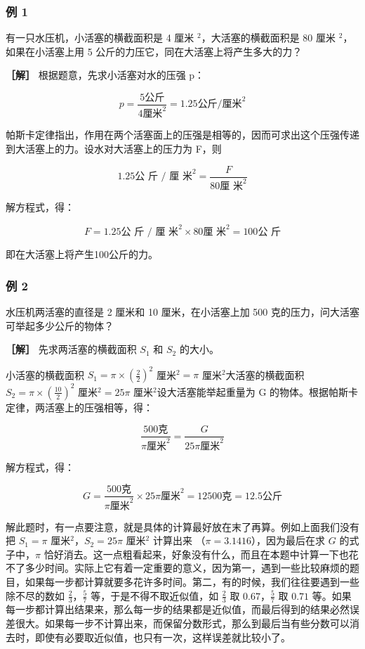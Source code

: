 \subsubsection{例 1}\label{ux4f8b-1-3}

有一只水压机，小活塞的横截面积是 4 厘米 \(^{2}\)，大活塞的横截面积是 80
厘米 \(^{2}\)，如果在小活塞上用 5
公斤的力压它，同在大活塞上将产生多大的力？

\textbf{［解］} 根据题意，先求小活塞对水的压强 p：

\[
p = \frac {5 \text{公斤}}{4 \text{厘米} ^ {2}} = 1.25 \text{公斤/厘米} ^ {2}
\]

帕斯卡定律指出，作用在两个活塞面上的压强是相等的，因而可求出这个压强传递到大活塞上的力。设水对大活塞上的压力为
F，则

\[
1.25 \text{公 斤 / 厘 米} ^ {2} = \frac {F}{80 \text{厘 米} ^ {2}}
\]

解方程式，得：

\[
F = 1.25 \text{公 斤 / 厘 米} ^ {2} \times 80 \text{厘 米} ^ {2} = 100 \text{公 斤}
\]

即在大活塞上将产生100公斤的力。

\subsubsection{例 2}\label{ux4f8b-2-3}

水压机两活塞的直径是 2 厘米和 10 厘米，在小活塞上加 500
克的压力，问大活塞可举起多少公斤的物体？

\textbf{［解］} 先求两活塞的横截面积 \(S_{1}\) 和 \(S_{2}\) 的大小。

小活塞的横截面积 \(S_{1} = \pi \times \left(\frac{2}{2}\right)^{2}\)
厘米\(^{2} = \pi\) 厘米\(^{2}\)大活塞的横截面积
\(S_{2} = \pi \times \left(\frac{10}{2}\right)^{2}\)
厘米\(^{2} = 25\pi\) 厘米\(^{2}\)设大活塞能举起重量为 G
的物体。根据帕斯卡定律，两活塞上的压强相等，得：

\[
\frac {500 \text{克}}{\pi \text{厘米} ^ {2}} = \frac {G}{25 \pi \text{厘米} ^ {2}}
\]

解方程式，得：

\[
G = \frac {500 \text{克}}{\pi \text{厘米} ^ {2}} \times 25 \pi \text{厘米} ^ {2} = 12500 \text{克} = 12.5 \text{公斤}
\]

解此题时，有一点要注意，就是具体的计算最好放在末了再算。例如上面我们没有把
\(S_{1} = \pi\) 厘米\(^{2}\)，\(S_{2} = 25\pi\) 厘米\(^{2}\) 计算出来
（\(\pi = 3.1416\)），因为最后在求 \(G\) 的式子中，\(\pi\)
恰好消去。这一点粗看起来，好象没有什么，而且在本题中计算一下也花不了多少时间。实际上它有着一定重要的意义，因为第一，遇到一些比较麻烦的题目，如果每一步都计算就要多花许多时间。第二，有的时候，我们往往要遇到一些除不尽的数如
\(\frac{2}{3}\)，\(\frac{5}{7}\) 等，于是不得不取近似值，如
\(\frac{2}{3}\) 取 \(0.67\)，\(\frac{5}{7}\) 取 \(0.71\)
等。如果每一步都计算出结果来，那么每一步的结果都是近似值，而最后得到的结果必然误差很大。如果每一步不计算出来，而保留分数形式，那么到最后当有些分数可以消去时，即使有必要取近似值，也只有一次，这样误差就比较小了。

